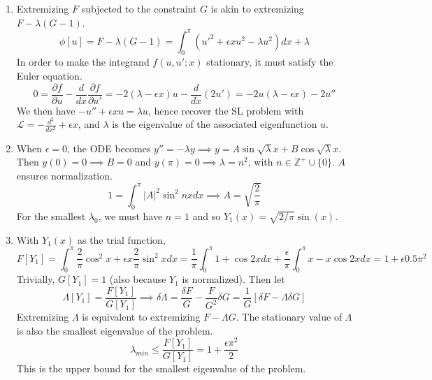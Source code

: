\documentclass[a4paper]{article}
\begin{document}
\begin{ans}\leavevmode
\begin{enumerate}[label=(\alph*)]
\item Extremizing $F$ subjected to the constraint $G$ is akin to extremizing $F-\lambda(G-1)$.
$$\phi[u]=F-\lambda(G-1)=\int_0^\pi(u'^2+\epsilon xu^2-\lambda u^2)dx+\lambda$$
In order to make the integrand $f(u,u';x)$ stationary, it must satisfy the Euler equation.
$$0=\frac{\partial f}{\partial u}-\frac{d}{dx}\frac{\partial f}{\partial u'}=-2(\lambda-\epsilon x)u-\frac{d}{dx}(2u')=-2u(\lambda-\epsilon x)-2u''$$
We then have $-u''+\epsilon xu=\lambda u$, hence recover the SL problem with $\mathcal{L}=-\frac{d^2}{dx^2}+\epsilon x$, and $\lambda$ is the eigenvalue of the associated eigenfunction $u$.
\item When $\epsilon=0$, the ODE becomes $y''=-\lambda y\implies y=A\sin\sqrt{\lambda }x+B\cos\sqrt{\lambda} x$. Then $y(0)=0\implies B=0$ and $y(\pi)=0\implies\lambda=n^2$, with $n\in\mathbb{Z}^+\cup\{0\}$. $A$ ensures normalization.
$$1=\int_0^\pi|A|^2\sin^2nxdx\implies A=\sqrt{\frac{2}{\pi}}$$
For the smallest $\lambda_0$, we must have $n=1$ and so $Y_1(x)=\sqrt{2/\pi}\sin(x)$. 
\item With $Y_1(x)$ as the trial function,
$$F[Y_1]=\int_0^\pi\frac{2}{\pi}\cos^2x+\epsilon x\frac{2}{\pi}\sin^2xdx=\frac{1}{\pi}\int_0^\pi 1+\cos 2xdx+\frac{\epsilon}{\pi}\int_0^\pi x-x\cos 2xdx=1+\epsilon 0.5\pi^2$$
Trivially, $G[Y_1]=1$ (also because $Y_1$ is normalized). Then let
$$\Lambda[Y_1]=\frac{F[Y_1]}{G[Y_1]}\implies\delta\Lambda=\frac{\delta F}{G}-\frac{F}{G^2}\delta G=\frac{1}{G}[\delta F-\Lambda\delta G]$$
Extremizing $\Lambda$ is equivalent to extremizing $F-\Lambda G$. The stationary value of $\Lambda$ is also the smallest eigenvalue of the problem. 
$$\lambda_{min}\leq\frac{F[Y_1]}{G[Y_1]}=1+\frac{\epsilon\pi^2}{2}$$
This is the upper bound for the smallest eigenvalue of the problem.
\end{enumerate}
\end{ans}
\newpage
\end{document}
